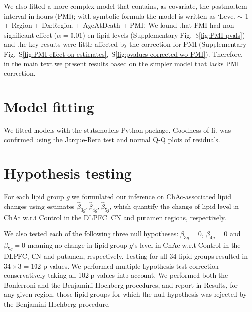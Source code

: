 \documentclass[letterpaper]{article}
\begin{document}
We also fitted a more complex model that contains, as covariate, the
postmortem interval in hours (PMI); with symbolic formula the model is
written as `Level $\sim$ 1 + Region + Dx:Region + AgeAtDeath + PMI`.  We found
that PMI had non-significant effect ($\alpha=0.01$) on lipid levels
(Supplementary Fig.~S\ref{fig:PMI-pvals}) and the key results were little affected by the
correction for PMI
(Supplementary Fig.~S\ref{fig:PMI-effect-on-estimates},~S\ref{fig:pvalues-corrected-wo-PMI}).
Therefore, in the main text we present results based on the simpler model that
lacks PMI correction.

\section{Model fitting}

We fitted models with the statsmodels Python package.  Goodness of fit was
confirmed using the Jarque-Bera test and normal Q-Q plots of
residuals.

\section{Hypothesis testing}

For each lipid group $g$ we formulated our inference on ChAc-associated lipid
changes using estimates $\hat{\beta}_{3g}, \hat{\beta}_{4g},
\hat{\beta}_{5g}$, which quantify the change of lipid level in ChAc w.r.t
Control in the DLPFC, CN and putamen regions, respectively.

We also tested each of the following three null hypotheses: $\beta_{3g} = 0$,
$\beta_{4g} = 0$ and $\beta_{5g} = 0$ meaning no change in lipid group $g$'s
level in ChAc w.r.t Control in the DLPFC, CN and putamen, respectively.
Testing for all 34 lipid groups resulted in $34 \times 3 = 102$ p-values.
We performed multiple hypothesis test correction conservatively taking all 102
p-values into account.  We performed both the Bonferroni and the
Benjamini-Hochberg procedures, and report in Results, for any given region,
those lipid groups for which the null hypothesis was rejected by the
Benjamini-Hochberg procedure.

\cleardoublepage
{}
{}



\pagebreak
\end{document}

